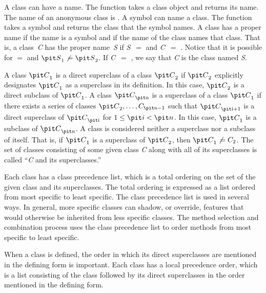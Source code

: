 A class can have a {\bit name}. The function  takes a
class object and returns its name. The name of an anonymous class is
.  A symbol can {\bit name\/} a class.  The function 
 takes a symbol and returns the class that the symbol
names. A class has a {\bit proper name\/} if the name is a symbol
and if the name of the class
names that class.  That is, a class~{\it C} has the {\bit proper
name\/}~{\it S} if {\it S}~$=$  and {\it C}~$=$ .  Notice that it is possible for 
$=$  and ${\it S}\sub 1\neq {\it S}\sub 2$.
If {\it C}~$=$ , we say that {\it C} is the {\bit class named}
{\it S}.

A class ${\it C}\sub{1}$ is a {\bit direct superclass\/} of a class
${\it C}\sub{2}$ if ${\it C}\sub{2}$ explicitly designates ${\it C}\sub{1}$ as a
superclass in its definition.  In this case, ${\it C}\sub{2}$ is a {\bit
direct subclass\/} of ${\it C}\sub{1}$.  A class ${\it C}\sub{\hbox{\scriptsize\it n}}$ is a {\bit
superclass\/} of a class ${\it C}\sub{1}$ if there exists a series of
classes ${\it C}\sub{2},\ldots,C\sub{\hbox{\scriptsize\it n}-1}$
such that ${\it C}\sub{\hbox{\scriptsize\it i}+1}$ is a
direct superclass of ${\it C}\sub{\hbox{\scriptsize\it i}}$ for $1 \leq {\it i} < {\it n}$.  In this case, 
${\it C}\sub{1}$ is a {\bit subclass\/} of ${\it C}\sub{\hbox{\scriptsize\it n}}$.  A class is
considered neither a superclass nor a subclass of itself.  That is, if
${\it C}\sub{1}$ is a superclass of ${\it C}\sub{2}$, then ${\it C}\sub{1} \neq
C\sub{2}$.  The set of classes consisting of some given
class {\it C} along with all of its superclasses is called ``{\it C} and its
superclasses.''

Each class has a {\bit class precedence list}, which is a total ordering
on the set of the given class and its superclasses.  The total ordering
is expressed as a list ordered from most specific to least specific.
The class precedence list is used in several ways.  In general, more
specific classes can {\bit shadow}, or override, features that would
otherwise be inherited from less specific classes.  The method selection
and combination process uses the class precedence list to order methods
from most specific to least specific. 
 
When a class is defined, the order in which its direct superclasses
are mentioned in the defining form is important.  Each class has a
{\bit local precedence order\/}, which is a list consisting of the
class followed by its direct superclasses in the order mentioned
in the defining form.

